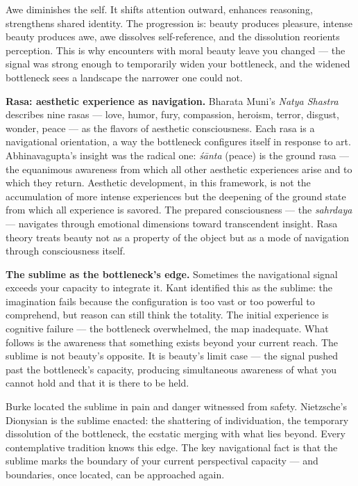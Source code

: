Awe diminishes the self. It shifts attention outward, enhances reasoning, strengthens shared identity. The progression is: beauty produces pleasure, intense beauty produces awe, awe dissolves self-reference, and the dissolution reorients perception. This is why encounters with moral beauty leave you changed — the signal was strong enough to temporarily widen your bottleneck, and the widened bottleneck sees a landscape the narrower one could not.


\textbf{Rasa: aesthetic experience as navigation.} Bharata Muni's \textit{Natya Shastra} describes nine rasas — love, humor, fury, compassion, heroism, terror, disgust, wonder, peace — as the flavors of aesthetic consciousness. Each rasa is a navigational orientation, a way the bottleneck configures itself in response to art. Abhinavagupta's insight was the radical one: \textit{śānta} (peace) is the ground rasa — the equanimous awareness from which all other aesthetic experiences arise and to which they return. Aesthetic development, in this framework, is not the accumulation of more intense experiences but the deepening of the ground state from which all experience is savored. The prepared consciousness — the \textit{sahrdaya} — navigates through emotional dimensions toward transcendent insight. Rasa theory treats beauty not as a property of the object but as a mode of navigation through consciousness itself.


\textbf{The sublime as the bottleneck's edge.} Sometimes the navigational signal exceeds your capacity to integrate it. Kant identified this as the sublime: the imagination fails because the configuration is too vast or too powerful to comprehend, but reason can still think the totality. The initial experience is cognitive failure — the bottleneck overwhelmed, the map inadequate. What follows is the awareness that something exists beyond your current reach. The sublime is not beauty's opposite. It is beauty's limit case — the signal pushed past the bottleneck's capacity, producing simultaneous awareness of what you cannot hold and that it is there to be held.


Burke located the sublime in pain and danger witnessed from safety. Nietzsche's Dionysian is the sublime enacted: the shattering of individuation, the temporary dissolution of the bottleneck, the ecstatic merging with what lies beyond. Every contemplative tradition knows this edge. The key navigational fact is that the sublime marks the boundary of your current perspectival capacity — and boundaries, once located, can be approached again.


